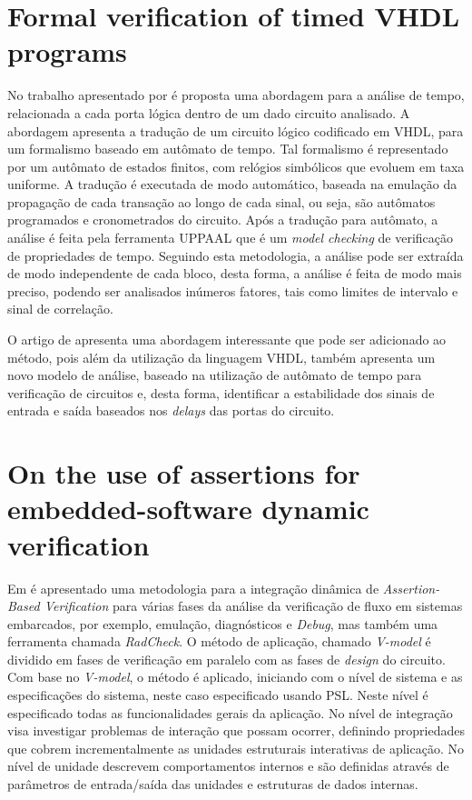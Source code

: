 \section{Formal verification of timed VHDL programs}
No trabalho apresentado por  é proposta uma abordagem para a análise de tempo, relacionada a cada porta lógica dentro de um dado circuito analisado. A abordagem apresenta a tradução de um circuito lógico codificado em VHDL, para um formalismo baseado em autômato de tempo\cite{alur1994theory}. Tal formalismo é representado por um autômato de estados finitos, com relógios simbólicos que evoluem em taxa uniforme. A tradução é executada de modo automático, baseada na emulação da propagação de cada transação ao longo de cada sinal, ou seja, são autômatos programados e cronometrados do circuito. Após a tradução para autômato, a análise é feita pela ferramenta UPPAAL\cite{larsen1997uppaal} que é um \textit{model checking} de verificação de propriedades de tempo. Seguindo esta metodologia, a análise pode ser extraída de modo independente de cada bloco, desta forma, a análise é feita de modo mais preciso, podendo ser analisados inúmeros fatores, tais como limites de intervalo e sinal de correlação.

\par
O artigo de  apresenta uma abordagem interessante que pode ser adicionado ao método, pois além da utilização da linguagem VHDL, também apresenta um novo modelo de análise, baseado na utilização de autômato de tempo para verificação de circuitos e, desta forma, identificar a estabilidade dos sinais de entrada e saída baseados nos \textit{delays} das portas do circuito.

\section{On the use of assertions for embedded-software dynamic verification}
Em  é apresentado uma metodologia para a integração dinâmica de \textit{Assertion-Based Verification} para várias fases da análise da verificação de fluxo em sistemas embarcados, por exemplo, emulação, diagnósticos e \textit{Debug}, mas também uma ferramenta chamada \textit{RadCheck}. O método de aplicação, chamado \textit{V-model} é dividido em fases de verificação em paralelo com as fases de \textit{design} do circuito. Com base no \textit{V-model}, o método é aplicado, iniciando com o nível de sistema e as especificações do sistema, neste caso especificado usando PSL. Neste nível é especificado todas as funcionalidades gerais da aplicação. No nível de integração visa investigar problemas de interação que possam ocorrer, definindo propriedades que cobrem incrementalmente as unidades estruturais interativas de aplicação. No nível de unidade descrevem comportamentos internos e são definidas através de parâmetros de entrada/saída das unidades e estruturas de dados internas.

